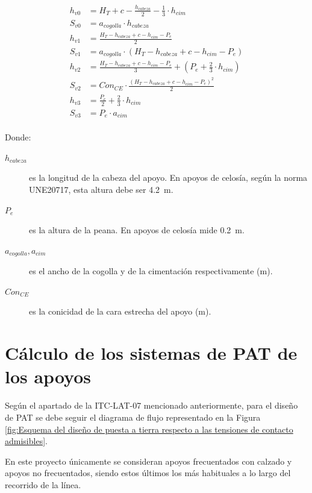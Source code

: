 \begin{align}
    h_{v0} &= H_T+c-\frac{h_{cabeza}}{2}-\frac{1}{3}\cdot h_{cim}
    \label{eq:altura-vuelco0}\\[0.5em]
    S_{v0} &= a_{cogolla}\cdot h_{cabeza}
    \label{eq:superficie-vuelco0}\\[0.5em]
    h_{v1} &= \frac{H_T-h_{cabeza}+c-h_{cim}-P_e}{2}
    \label{eq:altura-vuelco1}\\[0.5em]
    S_{v1} &= a_{cogolla}\cdot (H_T-h_{cabeza}+c-h_{cim}-P_e)
    \label{eq:superficie-vuelco1}\\[0.5em]
    h_{v2} &= \frac{H_T-h_{cabeza}+c-h_{cim}-P_e}{3} + (P_e+\frac{2}{3}\cdot h_{cim})
    \label{eq:altura-vuelco2}\\[0.5em]
    S_{v2} &= Con_{CE}\cdot\frac{(H_T-h_{cabeza}+c-h_{cim}-P_e)^2}{2}
    \label{eq:superficie-vuelco2}\\[0.5em]
    h_{v3} &= \frac{P_e}{2} +\frac{2}{3}\cdot h_{cim}
    \label{eq:altura-vuelco3}\\[0.5em]
    S_{v3} &= P_e\cdot a_{cim}
    \label{eq:superficie-vuelco3}\\[0.5em]
\end{align}

Donde:
\begin{description}
    \item[$h_{cabeza}$] es la longitud de la cabeza del apoyo. En apoyos de celosía, según la norma UNE20717, esta altura debe ser \SI{4.2}{\meter}.
    \item[$P_e$] es la altura de la peana. En apoyos de celosía mide \SI{0.2}{\meter}.
    \item[$a_{cogolla}, a_{cim}$] es el ancho de la cogolla y de la cimentación respectivamente (\si{\meter}).
    \item[$Con_{CE}$] es la conicidad de la cara estrecha del apoyo (\si{\meter}).
\end{description}
\section{Cálculo de los sistemas de PAT de los apoyos}
\label{sec:mc-pat}
Según el apartado de la ITC-LAT-07 mencionado anteriormente, para el diseño de \ac{PAT} se debe seguir el diagrama de flujo representado en la Figura \ref{fig:Esquema del diseño de puesta a tierra respecto a las tensiones de contacto admisibles}.

En este proyecto únicamente se consideran apoyos frecuentados con calzado y apoyos no frecuentados, siendo estos últimos los más habituales a lo largo del recorrido de la línea.

